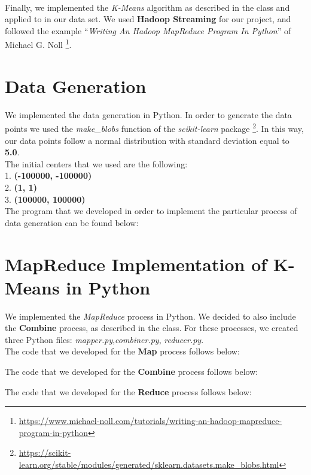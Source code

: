 \documentclass[12pt]{report}
\begin{document}
{

\mbox{} \\

Finally, we implemented the \emph{K-Means} algorithm
as described in the class
and applied to in our data set.
We used \textbf{Hadoop Streaming} for our project,
and followed the example
``\textit{Writing An Hadoop MapReduce Program In Python}''
of Michael G. Noll
\footnote{\url{https://www.michael-noll.com/tutorials/writing-an-hadoop-mapreduce-program-in-python}}.

\newpage

\section{Data Generation}
We implemented the data generation in Python.
In order to generate the data points we used
the \emph{make\_blobs} function of the \emph{scikit-learn} package
\footnote{\url{https://scikit-learn.org/stable/modules/generated/sklearn.datasets.make_blobs.html}}.
In this way, our data points follow a normal distribution
with standard deviation equal to \textbf{5.0}. \\
The initial centers that we used are the following: \\
1. \textbf{(-100000, -100000)} \\
2. \textbf{(1, 1)} \\
3. \textbf{(100000, 100000)} \\
The program that we developed
in order to implement the particular process of data generation
can be found below:


\newpage

\section{MapReduce Implementation of K-Means in Python}
\label{sec:implementation}
We implemented the \emph{MapReduce} process in Python.
We decided to also include the \textbf{Combine} process,
as described in the class.
For these processes, we created three Python files:
\emph{mapper.py},\emph{combiner.py}, \emph{reducer.py}. \\
\hfill \break
The code that we developed for the \textbf{Map} process follows below:

\hfill \break
The code that we developed for the \textbf{Combine} process follows below:

\hfill \break
The code that we developed for the \textbf{Reduce} process follows below:


}
\end{document}
